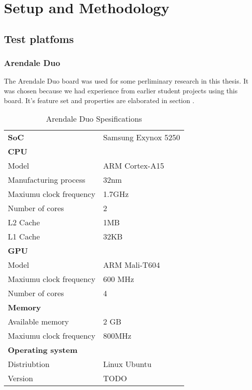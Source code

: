 \chapter[Setup and Methodology]{Setup and Methodology}

\section{Test platfoms}

\subsection{Arendale Duo}
The Arendale Duo board was used for some perliminary research in this thesis.
It was chosen because we had experience from earlier student projects using this board.
It's feature set and properties are elaborated in section .
\begin{table}[h]
  \begin{tabular}{ll}
    \textbf{SoC}              & Samsung Exynox 5250 \\
    \textbf{CPU}              &  \\
    Model                     & ARM Cortex-A15 \\
    Manufacturing process     & 32nm \\
    Maxiumu clock frequency   & 1.7GHz \\
    Number of cores           & 2 \\
    L2 Cache                  & 1MB \\
    L1 Cache                  & 32KB \\
    \textbf{GPU}              &  \\
    Model                     & ARM Mali-T604 \\
    Maxiumu clock frequency   & 600 MHz \\
    Number of cores           & 4 \\
    \textbf{Memory}           &  \\
    Available memory          & 2 GB \\
    Maxiumu clock frequency   & 800MHz \\
    \textbf{Operating system} &  \\
    Distriubtion              & Linux Ubuntu \\
    Version                   & TODO
  \end{tabular}
  \caption{Arendale Duo Spesifications\label{overflow}}
\end{table}
